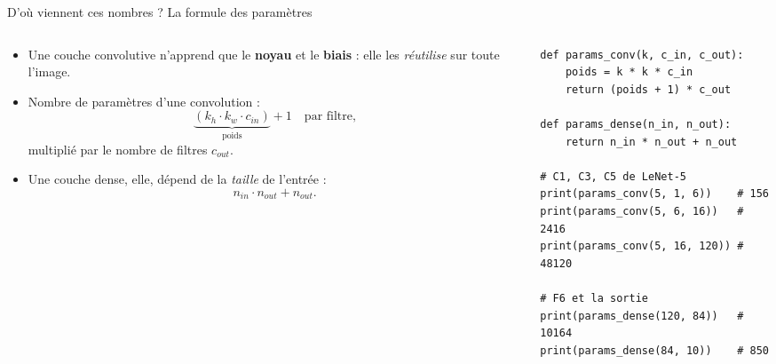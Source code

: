 \begin{frame}[fragile]{D'où viennent ces nombres ? La formule des paramètres}
\begin{columns}[t]
\begin{column}{0.50\textwidth}
\begin{itemize}
  \item Une couche convolutive n'apprend que le \textbf{noyau} et le
  \textbf{biais} : elle les \emph{réutilise} sur toute l'image.
  \item Nombre de paramètres d'une convolution :
  \[
    \underbrace{(k_h \cdot k_w \cdot c_{in})}_{\text{poids}} + 1
    \quad\text{par filtre,}
  \]
  multiplié par le nombre de filtres $c_{out}$.
  \item Une couche dense, elle, dépend de la \emph{taille} de l'entrée :
  \[
    n_{in} \cdot n_{out} + n_{out}.
  \]
\end{itemize}
\end{column}
\begin{column}{0.46\textwidth}
\begin{codebox}
\begin{lstlisting}
def params_conv(k, c_in, c_out):
    poids = k * k * c_in
    return (poids + 1) * c_out

def params_dense(n_in, n_out):
    return n_in * n_out + n_out

# C1, C3, C5 de LeNet-5
print(params_conv(5, 1, 6))    # 156
print(params_conv(5, 6, 16))   # 2416
print(params_conv(5, 16, 120)) # 48120

# F6 et la sortie
print(params_dense(120, 84))   # 10164
print(params_dense(84, 10))    # 850
\end{lstlisting}
\end{codebox}
\end{column}
\end{columns}
\end{frame}

